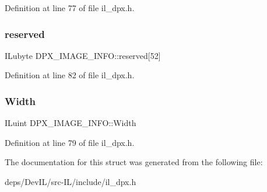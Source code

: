 Definition at line 77 of file il\+\_\+dpx.\+h.

\mbox{\label{structDPX__IMAGE__INFO_aae7cc7776cb10862e9fd151d80a69e1e}} 
\subsubsection{\texorpdfstring{reserved}{reserved}}
{\footnotesize\ttfamily I\+Lubyte D\+P\+X\+\_\+\+I\+M\+A\+G\+E\+\_\+\+I\+N\+F\+O\+::reserved\mbox{[}52\mbox{]}}



Definition at line 82 of file il\+\_\+dpx.\+h.

\mbox{\label{structDPX__IMAGE__INFO_a280aa5bdaf14b928810aaa2c3bc95c87}} 
\subsubsection{\texorpdfstring{Width}{Width}}
{\footnotesize\ttfamily I\+Luint D\+P\+X\+\_\+\+I\+M\+A\+G\+E\+\_\+\+I\+N\+F\+O\+::\+Width}



Definition at line 79 of file il\+\_\+dpx.\+h.



The documentation for this struct was generated from the following file\+:\begin{DoxyCompactItemize}
\item 
deps/\+Dev\+I\+L/src-\/\+I\+L/include/il\+\_\+dpx.\+h\end{DoxyCompactItemize}
